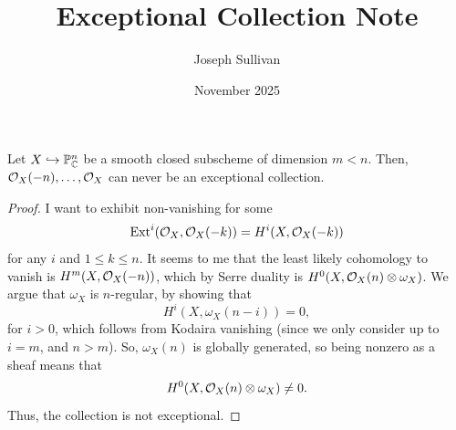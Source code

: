 \documentclass[12pt]{article}
\title{Exceptional Collection Note}
\author{Joseph Sullivan}
\date{November 2025}
\begin{document}
\maketitle

\begin{prop}
    Let $X\hookrightarrow \mathbb{P}^n_{\mathbb{C}}$ be a smooth closed subscheme of dimension $m<n$. Then, $\mathcal{O}_X(-n),\dots,\mathcal{O}_X$ can never be an exceptional collection.
\end{prop}

\begin{proof}
    I want to exhibit non-vanishing for some
    \[\mathrm{Ext}^i(\mathcal{O}_X, \mathcal{O}_X(-k)) = H^i(X,\mathcal{O}_X(-k))\]
    for any $i$ and $1\leq k \leq n$. It seems to me that the least likely cohomology to vanish is $H^m(X,\mathcal{O}_X(-n))$, which by Serre duality is $H^0(X, \mathcal{O}_X(n) \otimes \omega_X)$. We argue that $\omega_X$ is $n$-regular, by showing that
    \[H^i(X,\omega_X(n-i)) = 0,\]
    for $i>0$, which follows from Kodaira vanishing (since we only consider up to $i=m$, and $n>m$). So, $\omega_X(n)$ is globally generated, so being nonzero as a sheaf means that
    \[H^0(X,\mathcal{O}_X(n)\otimes \omega_X) \neq 0.\]
    Thus, the collection is not exceptional.
\end{proof}
\end{document}
